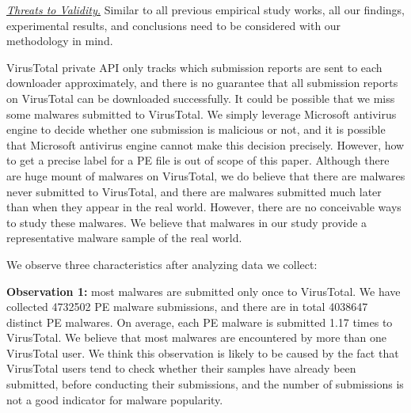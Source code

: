 \textit{\underline{Threats to Validity.}}
Similar to all previous empirical study works, all our findings, experimental results, 
and conclusions need to be considered with our methodology in mind. 

VirusTotal private API only tracks which submission reports are sent to each downloader approximately, 
and there is no guarantee that all submission reports on VirusTotal can be downloaded successfully. 
It could be possible that we miss some malwares submitted to VirusTotal. 
We simply leverage Microsoft antivirus engine to decide whether one submission is malicious or not, 
and it is possible that Microsoft antivirus engine cannot make this decision precisely. 
However, how to get a precise label for a PE file is out of scope of this paper.  
Although there are huge mount of malwares on VirusTotal, we do believe that there are malwares never submitted to VirusTotal, 
and there are malwares submitted much later than when they appear in the real world.
However, there are no conceivable ways to study these malwares. 
We believe that malwares in our study provide a representative malware sample of the real world. 




We observe three characteristics after analyzing data we collect:

{\bf Observation 1:} 
most malwares are submitted only once to VirusTotal. 
We have collected 4732502 PE malware submissions, and there are in total 4038647 distinct PE malwares. 
On average, each PE malware is submitted 1.17 times to VirusTotal. 
We believe that most malwares are encountered by more than one VirusTotal user. 
We think this observation is likely to be caused by the fact that VirusTotal users 
tend to check whether their samples have already been submitted, 
before conducting their submissions, 
and the number of submissions is not a good indicator for malware popularity. 





